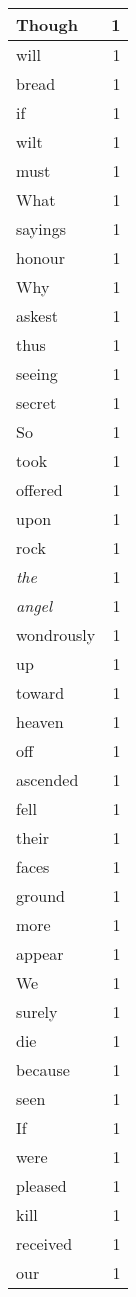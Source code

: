 \begin{center}
\begin{longtable}{l|r}
Though & 1\\ \hline 
will & 1\\ \hline 
bread & 1\\ \hline 
if & 1\\ \hline 
wilt & 1\\ \hline 
must & 1\\ \hline 
What & 1\\ \hline 
sayings & 1\\ \hline 
honour & 1\\ \hline 
Why & 1\\ \hline 
askest & 1\\ \hline 
thus & 1\\ \hline 
seeing & 1\\ \hline 
secret & 1\\ \hline 
So & 1\\ \hline 
took & 1\\ \hline 
offered & 1\\ \hline 
upon & 1\\ \hline 
rock & 1\\ \hline 
\emph{the} & 1\\ \hline 
\emph{angel} & 1\\ \hline 
wondrously & 1\\ \hline 
up & 1\\ \hline 
toward & 1\\ \hline 
heaven & 1\\ \hline 
off & 1\\ \hline 
ascended & 1\\ \hline 
fell & 1\\ \hline 
their & 1\\ \hline 
faces & 1\\ \hline 
ground & 1\\ \hline 
more & 1\\ \hline 
appear & 1\\ \hline 
We & 1\\ \hline 
surely & 1\\ \hline 
die & 1\\ \hline 
because & 1\\ \hline 
seen & 1\\ \hline 
If & 1\\ \hline 
were & 1\\ \hline 
pleased & 1\\ \hline 
kill & 1\\ \hline 
received & 1\\ \hline 
our & 1\\ \hline 

\end{longtable}
\end{center}
